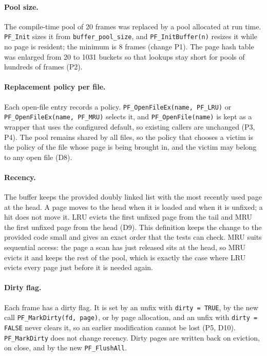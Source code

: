 \documentclass[11pt,a4paper]{article}
\begin{document}
\paragraph{Pool size.} The compile-time pool of 20 frames was replaced by a pool allocated at run time. \texttt{PF\_Init} sizes it from \texttt{buffer\_pool\_size}, and \texttt{PF\_InitBuffer(n)} resizes it while no page is resident; the minimum is 8 frames (change P1). The page hash table was enlarged from 20 to 1031 buckets so that lookups stay short for pools of hundreds of frames (P2).

\paragraph{Replacement policy per file.} Each open-file entry records a policy. \texttt{PF\_OpenFileEx(name, PF\_LRU)} or \texttt{PF\_OpenFileEx(name, PF\_MRU)} selects it, and \texttt{PF\_OpenFile(name)} is kept as a wrapper that uses the configured default, so existing callers are unchanged (P3, P4). The pool remains shared by all files, so the policy that chooses a victim is the policy of the file whose page is being brought in, and the victim may belong to any open file (D8).

\paragraph{Recency.} The buffer keeps the provided doubly linked list with the most recently used page at the head. A page moves to the head when it is loaded and when it is unfixed; a hit does not move it. LRU evicts the first unfixed page from the tail and MRU the first unfixed page from the head (D9). This definition keeps the change to the provided code small and gives an exact order that the tests can check. MRU suits sequential access: the page a scan has just released sits at the head, so MRU evicts it and keeps the rest of the pool, which is exactly the case where LRU evicts every page just before it is needed again.

\paragraph{Dirty flag.} Each frame has a dirty flag. It is set by an unfix with \texttt{dirty = TRUE}, by the new call \texttt{PF\_MarkDirty(fd, page)}, or by page allocation, and an unfix with \texttt{dirty = FALSE} never clears it, so an earlier modification cannot be lost (P5, D10). \texttt{PF\_MarkDirty} does not change recency. Dirty pages are written back on eviction, on close, and by the new \texttt{PF\_FlushAll}.
\end{document}
